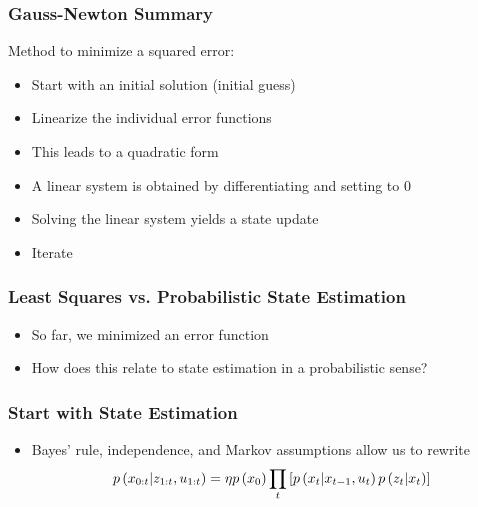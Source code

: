 \begin{frame}
    \frametitle{Gauss-Newton Summary}
    
    Method to minimize a squared error:
    \begin{itemize} 
        \item Start with an initial solution (initial guess)
        \item Linearize the individual error functions
        \item This leads to a quadratic form
        \item A linear system is obtained by differentiating and setting to 0
        \item Solving the linear system yields a state update
        \item Iterate
    \end{itemize}
    
\end{frame}

\begin{frame}
    \frametitle{Least Squares vs. Probabilistic State Estimation}
    
    \begin{itemize}
        \item So far, we minimized an error function
        \item How does this relate to state estimation in a probabilistic sense?
    \end{itemize}
    
\end{frame}

\begin{frame}
    \frametitle{Start with State Estimation}
    
    \begin{itemize}
        \item Bayes' rule, independence, and Markov assumptions allow us to rewrite
        \begin{equation*}
            p\left( x_{0:t} | z_{1:t}, u_{1:t} \right) = \eta p\left( x_{0} \right) \prod_{t} \left[ p\left( x_{t} | x_{t-1}, u_{t} \right) p\left( z_{t} | x_{t} \right) \right]
        \end{equation*}
    \end{itemize}
    
    
\end{frame}

